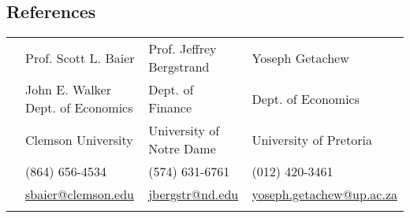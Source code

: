 \documentclass[margin,line]{res}                          %
\begin{document}
\begin{resume}
\section{\sc References}
\vspace{.05in}
\begin{tabular}{@{} p{2in} p{2.2in} p{2in} p{2in} }
& Prof. Scott L. Baier                    & Prof. Jeffrey Bergstrand & Yoseph Getachew \\
& John E. Walker Dept. of Economics         & Dept. of Finance & Dept. of Economics\\
& Clemson University                           & University of Notre Dame & University of Pretoria \\
& (864) 656-4534                           &  (574) 631-6761 & (012) 420-3461 \\
& \href{mailto:sbaier@clemson.edu}{sbaier@clemson.edu} & \href{mailto:jbergstr@nd.edu}{jbergstr@nd.edu} & \href{mailto:yoseph.getachew@up.ac.za}{yoseph.getachew@up.ac.za} \\
&                                      & \\
\end{tabular}

\end{resume}

%
%
\end{document}

